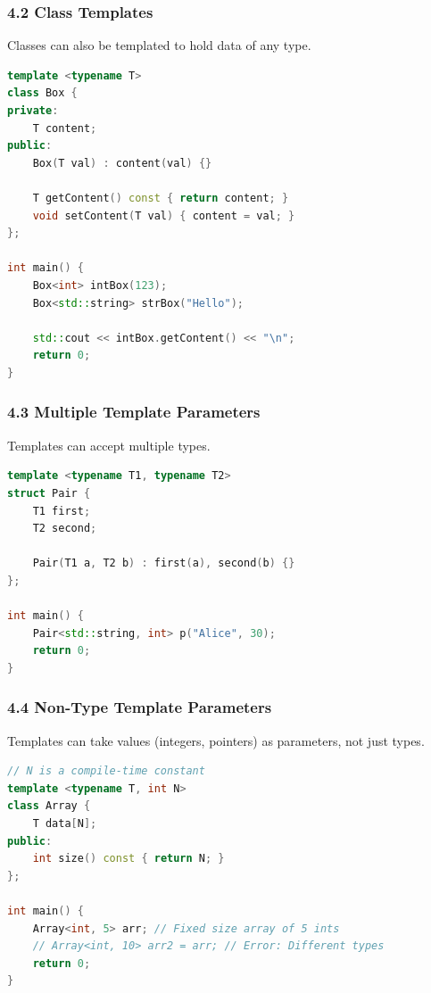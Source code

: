 \hypertarget{class-templates}{%
\subsubsection{4.2 Class Templates}\label{class-templates}}

Classes can also be templated to hold data of any type.

\begin{lstlisting}[language={C++}]
template <typename T>
class Box {
private:
    T content;
public:
    Box(T val) : content(val) {}

    T getContent() const { return content; }
    void setContent(T val) { content = val; }
};

int main() {
    Box<int> intBox(123);
    Box<std::string> strBox("Hello");

    std::cout << intBox.getContent() << "\n";
    return 0;
}
\end{lstlisting}

\hypertarget{multiple-template-parameters}{%
\subsubsection{4.3 Multiple Template
Parameters}\label{multiple-template-parameters}}

Templates can accept multiple types.

\begin{lstlisting}[language={C++}]
template <typename T1, typename T2>
struct Pair {
    T1 first;
    T2 second;

    Pair(T1 a, T2 b) : first(a), second(b) {}
};

int main() {
    Pair<std::string, int> p("Alice", 30);
    return 0;
}
\end{lstlisting}

\hypertarget{non-type-template-parameters}{%
\subsubsection{4.4 Non-Type Template
Parameters}\label{non-type-template-parameters}}

Templates can take values (integers, pointers) as parameters, not just
types.

\begin{lstlisting}[language={C++}]
// N is a compile-time constant
template <typename T, int N>
class Array {
    T data[N];
public:
    int size() const { return N; }
};

int main() {
    Array<int, 5> arr; // Fixed size array of 5 ints
    // Array<int, 10> arr2 = arr; // Error: Different types
    return 0;
}
\end{lstlisting}

